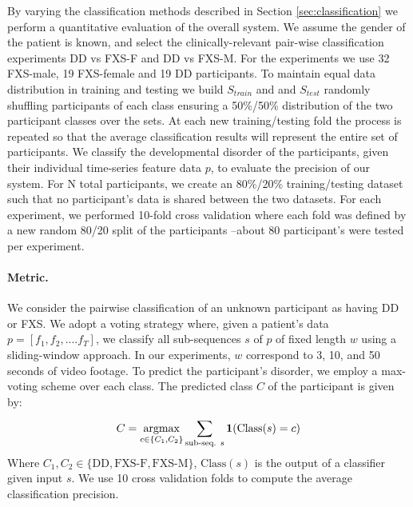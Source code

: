 \documentclass{llncs}
\begin{document}
  \vspace*{-\baselineskip}
  By varying the classification methods described in Section \ref{sec:classification} we perform a quantitative evaluation of the overall system.
  We assume the gender of the patient is known, and select the clinically-relevant pair-wise classification experiments DD vs FXS-F and DD vs FXS-M. For the experiments we use 32 FXS-male, 19 FXS-female and 19 DD participants. To maintain equal data distribution in training and testing we build $S_{train}$ and and $S_{test}$ randomly shuffling participants of each class ensuring a 50\%/50\% distribution of the two participant classes over the sets. At each new training/testing fold the process is repeated so that the average classification results will represent the entire set of participants. We classify the developmental disorder of the participants, given their individual time-series feature data $p$, to evaluate the precision of our system. For N total participants, we create an 80\%/20\% training/testing dataset such that no participant's data is shared between the two datasets. For each experiment, we performed 10-fold cross validation where each fold was defined by a new random 80/20 split of the participants --about 80 participant's were tested per experiment. %
  \vspace*{-\baselineskip}

  \paragraph{Metric.}
  We consider the pairwise classification of an unknown participant as having DD or FXS. We adopt a voting strategy where, given a patient's data $p=[f_1, f_2,....f_{T}]$, we classify all sub-sequences $s$ of $p$ of fixed length $w$ using a sliding-window approach. In our experiments, $w$ correspond to 3, 10, and 50 seconds of video footage. To predict the participant's disorder, we employ a max-voting scheme over each class. The predicted class $C$ of the participant is given by:
  \begin{equation}
    C = \underset{c \in \{C_1, C_2\}} {\operatorname{argmax}} \sum_{\text{sub-seq. } s}^{} \bold{1}(\text{Class}(s) = c)
  \end{equation}
  Where $C_1, C_2 \in \{\text{DD}, \text{FXS-F}, \text{FXS-M}\}$, $\text{Class}(s)$ is the output of a classifier given input $s$. We use 10 cross validation folds to compute the average classification precision.
\end{document}
